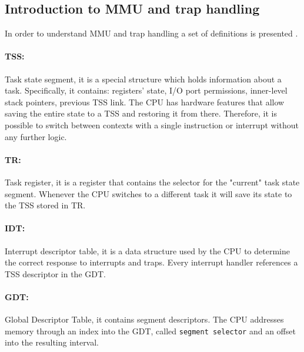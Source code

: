 \documentclass[11pt,twoside,a4paper]{article}
\begin{document}
\subsection{Introduction to MMU and trap handling}

In order to understand MMU and trap handling a set of definitions is presented \cite{intel}.


\paragraph{TSS: } Task state segment, it is a special structure which holds information about a task. Specifically, it contains: registers' state, I/O port permissions, inner-level stack pointers, previous TSS link. The CPU has hardware features that allow saving the entire state to a TSS and restoring it from there. Therefore, it is possible to switch between contexts with a single instruction or interrupt without any further logic.

\paragraph{TR: } Task register, it is a register that contains the selector for the "current" task state segment. Whenever the CPU switches to a different task it will save its state to the TSS stored in TR.

\paragraph{IDT: } Interrupt descriptor table, it is a data structure used by the CPU to determine the correct response to interrupts and traps. Every interrupt handler references a TSS descriptor in the GDT.

\paragraph{GDT: } Global Descriptor Table, it contains segment descriptors. The CPU addresses memory through an index into the GDT, called \texttt{segment selector} and an offset into the resulting interval.
\end{document}
